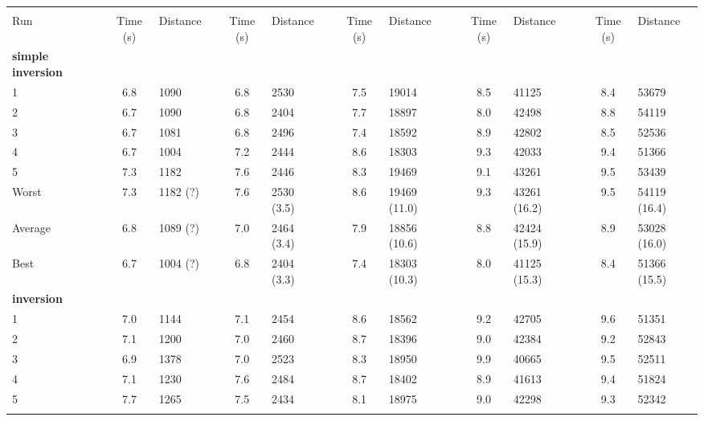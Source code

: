 \begin{sidewaystable}[hbpt]\centering
\footnotesize{
\begin{tabular} {l l S  l l S l l S l l S l l S l}
\toprule
&&  &&  &&   & & &&  \\          
Run & & {Time (s)} & Distance & & {Time (s)} & Distance && {Time (s)} & Distance && {Time (s)} & Distance && {Time (s)} & Distance \\ \midrule\addlinespace
\textbf{simple inversion} \\
1   &&  6.8 & 1090 && 6.8 & 2530  &&  7.5 & 19014  && 8.5 & 41125 && 8.4 & 53679 \\
2   &&  6.7 & 1090 && 6.8 & 2404  && 7.7 & 18897 && 8.0 & 42498 &&  8.8 & 54119   \\
3   &&  6.7 & 1081 && 6.8 & 2496 &&  7.4 & 18592 &&  8.9    & 42802  && 8.5  & 52536     \\
4   &&  6.7 & 1004 && 7.2 & 2444  && 8.6     & 18303   && 9.3 & 42033  && 9.4 & 51366  \\
5   &&  7.3 & 1182 && 7.6 & 2446  && 8.3    & 19469       && 9.1 & 43261 && 9.5   & 53439   \\ \addlinespace
Worst  &&  7.3 & 1182 (?) && 7.6 & 2530 (3.5) &&  8.6  &  19469  (11.0) && 9.3  & 43261 (16.2) &&  9.5 &  54119 (16.4)  \\
Average&&  6.8 & 1089 (?) && 7.0 & 2464 (3.4) && 7.9  & 18856  (10.6) && 8.8   &  42424 (15.9) && 8.9  &  53028 (16.0)    \\
Best   && 6.7 & 1004 (?) && 6.8 & 2404 (3.3)  &&  7.4 & 18303  (10.3) &&  8.0 &  41125 (15.3) &&  8.4 &  51366 (15.5)     \\\midrule\addlinespace\addlinespace
\textbf{inversion} \\
1   &&  7.0 & 1144 && 7.1 & 2454  &&  8.6 & 18562  && 9.2 & 42705 && 9.6 & 51351 \\
2   &&  7.1 & 1200 && 7.0 & 2460  && 8.7 & 18396 && 9.0 & 42384 &&  9.2 & 52843   \\
3   &&  6.9 & 1378 && 7.0 & 2523 &&  8.3 & 18950 &&  9.9   & 40665  && 9.5  & 52511     \\
4   &&  7.1 & 1230 && 7.6 & 2484  && 8.7     & 18402   && 8.9 & 41613  && 9.4 & 51824  \\
5   &&  7.7 & 1265 && 7.5 & 2434  && 8.1   & 18975       && 9.0 & 42298 && 9.3   &  52342  \\ \addlinespace

\end{tabular}}
\end{sidewaystable}
